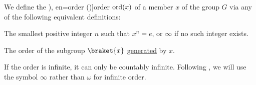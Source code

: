 \begin{definition}\label{def:group_element_order}
  We define the \term[ru=степень (\cite[86]{Тыртышников2017ОсновыАлгебры}), en=order (\cite[45]{Knapp2016BasicAlgebra})]{order} \( \operatorname{ord}(x) \) of a member \( x \) of the group \( G \) via any of the following equivalent definitions:
  \begin{thmenum}
     The smallest positive integer \( n \) such that \( x^n = e \), or \( \infty \) if no such integer exists.

     The order of the subgroup \( \braket{ x } \) \hyperref[def:group/submodel]{generated} by \( x \).
  \end{thmenum}
\end{definition}
\begin{comments}
  \item If the order is infinite, it can only be countably infinite. Following , we will use the symbol \( \infty \) rather than \( \omega \) for infinite order.
\end{comments}
